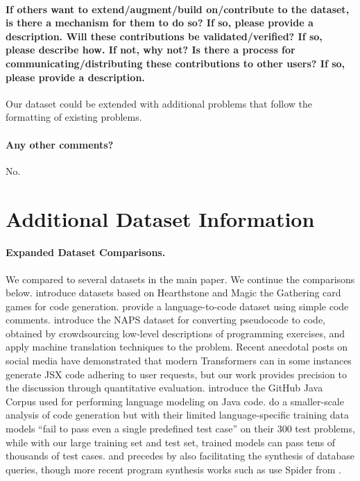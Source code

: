\documentclass{article}
\begin{document}
\paragraph{If others want to extend/augment/build on/contribute to the
dataset, is there a mechanism for them to do so? If so, please
provide a description. Will these contributions be validated/verified?
If so, please describe how. If not, why not? Is there a process for communicating/distributing these contributions to other users? If so, please
provide a description.}
Our dataset could be extended with additional problems that follow the formatting of existing problems.

\paragraph{Any other comments?}
No.


\section{Additional Dataset Information}


\paragraph{Expanded Dataset Comparisons.}
We compared to several datasets in the \citep{NEURIPS2019_7298332f,yu2018spider,Raychev2016ProbabilisticMF,iyer-etal-2018-mapping,Lu2021CodeXGLUEAM} main paper. We continue the comparisons below.
\citet{Ling2016LatentPN} introduce datasets based on Hearthstone and Magic the Gathering card games for code generation. \citet{oda2015ase:pseudogen1} provide a language-to-code dataset using simple code comments. \citet{Zavershynskyi2018NAPSNP} introduce the NAPS dataset for converting pseudocode to code, obtained by crowdsourcing low-level descriptions of programming exercises, and apply machine translation techniques to the problem. Recent anecdotal posts on social media have demonstrated that modern Transformers can in some instances generate JSX code adhering to user requests, but our work provides precision to the discussion through quantitative evaluation. \citet{allamanis2013mining} introduce the GitHub Java Corpus used for performing language modeling on Java code. \citet{raca} do a smaller-scale analysis of code generation but with their limited language-specific training data models ``fail to pass even a single predefined test case'' on their 300 test problems, while with our large training set and test set, trained models can pass tens of thousands of test cases. \citet{Zelle1996LearningTP} and \citet{Tang2001UsingMC} precedes \citet{yu2018spider} by also facilitating the synthesis of database queries, though more recent program synthesis works such as \citet{wang2019rat} use Spider from \citet{yu2018spider}.
\end{document}
